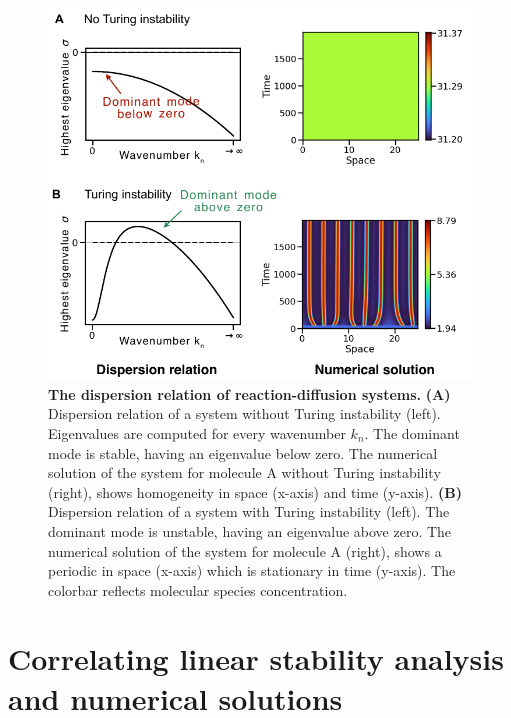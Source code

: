 \begin{figure}[H] %
    \centering
    \includegraphics[width=01\textwidth]{chapters/Chapter 1/turing_vs_noturing} %
    \caption{\textbf{The dispersion relation of reaction-diffusion systems.} \textbf{(A)} Dispersion relation of a system without Turing instability (left). Eigenvalues are computed for every wavenumber $k_{n}$. The dominant mode is stable, having an eigenvalue below zero. The numerical solution of the system for molecule A without Turing instability (right), shows homogeneity in space (x-axis) and time (y-axis).  \textbf{(B)} Dispersion relation of a system with Turing instability (left). The dominant mode is unstable, having an eigenvalue above zero. The numerical solution of the system for molecule A (right), shows a periodic in space (x-axis) which is stationary in time (y-axis). The colorbar reflects molecular species concentration.}
    \label{fig:turing_vs_noturing} %
\end{figure}

\section{Correlating linear stability analysis and numerical solutions}
